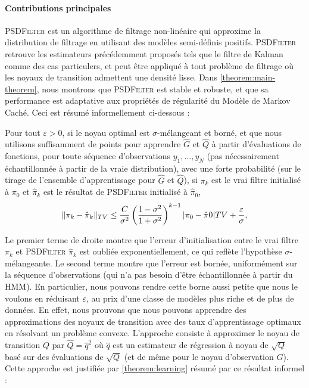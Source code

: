 \paragraph{Contributions principales}
\textsc{PSDFilter} est un algorithme de filtrage non-linéaire qui approxime la distribution de filtrage en utilisant des modèles semi-définis positifs. \textsc{PSDFilter} retrouve les estimateurs précédemment proposés tels que le filtre de Kalman comme des cas particulers, et peut être appliqué à tout problème de filtrage où les noyaux de transition admettent une densité lisse.
Dans \cref{theorem:main-theorem}, nous montrons que \textsc{PSDFilter} est stable et robuste, et que sa performance est adaptative aux propriétés de régularité du Modèle de Markov Caché. Ceci est résumé informellement ci-dessous :
\begin{mdframed}
\begin{informaltheorem}
Pour tout $\varepsilon > 0$, si le noyau optimal est $\sigma$-mélangeant et borné, et que nous utilisons suffisamment de points pour apprendre $\hat G$ et $\hat Q$ à partir d'évaluations de fonctions, pour toute séquence d'observations $y_1, \ldots, y_N$ (pas nécessairement échantillonnée à partir de la vraie distribution), avec une forte probabilité (sur le tirage de l'ensemble d'apprentissage pour $\hat G$ et $\hat Q$), si $\pi_k$ est le vrai filtre initialisé à $\pi_0$ et $\hat \pi_k$ est le résultat de \textsc{PSDFilter} initialisé à $\hat \pi_0$,
\begin{align*}
\Vert \pi_k - \hat\pi_k\Vert_{TV} \leq \frac{C}{\sigma^2}\left(\frac{1-\sigma^2}{1 + \sigma^2}\right)^{k-1}|\pi_0 - \hat{\pi}0|{TV} + \frac{\varepsilon}{\sigma},
\end{align*}
\end{informaltheorem}
\end{mdframed}
Le premier terme de droite montre que l'erreur d'initialisation entre le vrai filtre $\pi_k$ et \textsc{PSDFilter} $\hat \pi_k$ est oubliée exponentiellement, ce qui reflète l'hypothèse $\sigma$-mélangeante. Le second terme montre que l'erreur est bornée, uniformément sur la séquence d'observations (qui n'a pas besoin d'être échantillonnée à partir du HMM). En particulier, nous pouvons rendre cette borne aussi petite que nous le voulons en réduisant $\varepsilon$, au prix d'une classe de modèles plus riche et de plus de données.
En effet, nous prouvons que nous pouvons apprendre des approximations des noyaux de transition avec des taux d'apprentissage optimaux en résolvant un problème convexe. L'approche consiste à approximer le noyau de transition $Q$ par $\hat Q = \hat q^2$ où $\hat q$ est un estimateur de régression à noyau de $\sqrt{Q}$ basé sur des évaluations de $\sqrt{Q}$ (et de même pour le noyau d'observation $G$). Cette approche est justifiée par \cref{theorem:learning} résumé par ce résultat informel :
